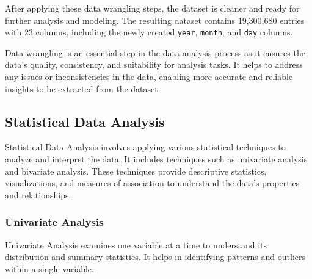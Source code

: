 \documentclass{article}
\begin{document}
After applying these data wrangling steps, the dataset is cleaner and ready for further analysis and modeling. The resulting dataset contains 19,300,680 entries with 23 columns, including the newly created \texttt{year}, \texttt{month}, and \texttt{day} columns.

Data wrangling is an essential step in the data analysis process as it ensures the data's quality, consistency, and suitability for analysis tasks. It helps to address any issues or inconsistencies in the data, enabling more accurate and reliable insights to be extracted from the dataset.


\subsection{Statistical Data Analysis}
Statistical Data Analysis involves applying various statistical techniques to analyze and interpret the data. It includes techniques such as univariate analysis and bivariate analysis. These techniques provide descriptive statistics, visualizations, and measures of association to understand the data's properties and relationships.

\subsubsection{Univariate Analysis}
Univariate Analysis examines one variable at a time to understand its distribution and summary statistics. It helps in identifying patterns and outliers within a single variable.
\end{document}
